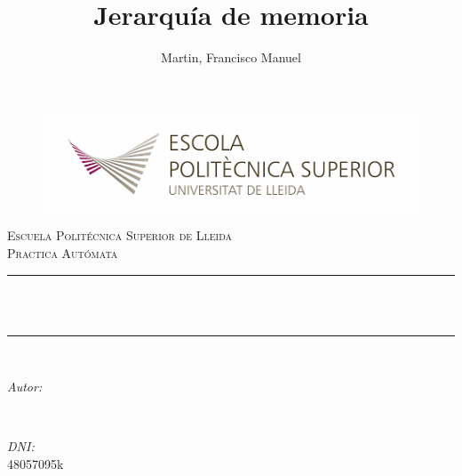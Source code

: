\documentclass{article}
\title{Jerarquía de memoria}
\author{Martin, Francisco Manuel
}
\makeatletter
\let\thetitle\@title
\let\theauthor\@author
\let\thedate\@date
\makeatother
\begin{document}
    \begin{titlepage}
        \begin{figure}[h]

            \includegraphics[scale=0.38]{1}
        \end{figure}
        \centering
        \vspace*{0.5 cm}

        \textsc{\LARGE Escuela Politécnica Superior de Lleida}\\[2.0 cm]    %
        \textsc{\large Practica Autómata}\\[0.5 cm]                %
        \rule{\linewidth}{0.2 mm} \\[0.4 cm]
        { \huge \bfseries \thetitle}\\
        \rule{\linewidth}{0.2 mm} \\[1.5 cm]

        \begin{minipage}{0.4\textwidth}
            \begin{flushleft}
                \large
                \emph{Autor:}\\
                \theauthor
            \end{flushleft}
        \end{minipage}~
        \begin{minipage}{0.4\textwidth}
            \begin{flushright}
                \large
                \emph{DNI:} \\
                48057095k %
            \end{flushright}
        \end{minipage}\\[2 cm]

        {\large \thedate}\\[2 cm]

        \vfill

    \end{titlepage}
    \tableofcontents
    \pagebreak
\end{document}
